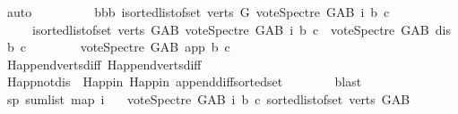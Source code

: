 \begin{isabellebody}
\ auto\ \ \isanewline
\ \ \ \ \isamarkupfalse%
\ \isamarkupfalse%
\ bbb{\isacharcolon}{\kern0pt}\ {\isachardoublequoteopen}{\isacharparenleft}{\kern0pt}{\isasymSum}i{\isasymleftarrow}sorted{\isacharunderscore}{\kern0pt}list{\isacharunderscore}{\kern0pt}of{\isacharunderscore}{\kern0pt}set\ {\isacharparenleft}{\kern0pt}verts\ G{\isacharparenright}{\kern0pt}{\isachardot}{\kern0pt}\ vote{\isacharunderscore}{\kern0pt}Spectre\ G{\isacharunderscore}{\kern0pt}AB\ i\ b\ c{\isacharparenright}{\kern0pt}\ {\isacharequal}{\kern0pt}\isanewline
\ \ \ \ \ {\isacharparenleft}{\kern0pt}{\isasymSum}i{\isasymleftarrow}sorted{\isacharunderscore}{\kern0pt}list{\isacharunderscore}{\kern0pt}of{\isacharunderscore}{\kern0pt}set\ {\isacharparenleft}{\kern0pt}verts\ G{\isacharunderscore}{\kern0pt}AB{\isacharparenright}{\kern0pt}{\isachardot}{\kern0pt}\ vote{\isacharunderscore}{\kern0pt}Spectre\ G{\isacharunderscore}{\kern0pt}AB\ i\ b\ c{\isacharparenright}{\kern0pt}\ {\isacharminus}{\kern0pt}\ vote{\isacharunderscore}{\kern0pt}Spectre\ G{\isacharunderscore}{\kern0pt}AB\ dis\ b\ c\isanewline
\ \ \ \ \ \ \ {\isacharminus}{\kern0pt}\ vote{\isacharunderscore}{\kern0pt}Spectre\ G{\isacharunderscore}{\kern0pt}AB\ app\ b\ c{\isachardoublequoteclose}\isanewline
\ \ \ \ \ \ \isamarkupfalse%
\ H{}{\isachardot}{\kern0pt}append{\isacharunderscore}{\kern0pt}verts{\isacharunderscore}{\kern0pt}diff\ H{}{\isachardot}{\kern0pt}append{\isacharunderscore}{\kern0pt}verts{\isacharunderscore}{\kern0pt}diff\ \isanewline
\ \ \ \ \ \ \isamarkupfalse%
\ H{}{\isachardot}{\kern0pt}app{\isacharunderscore}{\kern0pt}not{\isacharunderscore}{\kern0pt}dis\ \ H{}{\isachardot}{\kern0pt}app{\isacharunderscore}{\kern0pt}in{}\ H{}{\isachardot}{\kern0pt}app{\isacharunderscore}{\kern0pt}in\ append{\isacharunderscore}{\kern0pt}diff{\isacharunderscore}{\kern0pt}sorted{\isacharunderscore}{\kern0pt}set{}\isanewline
\ \ \ \ \ \ \isamarkupfalse%
\ blast\ \ \ \isanewline
\ \ \ \ \isamarkupfalse%
\ sp{}{\isacharcolon}{\kern0pt}\ {\isachardoublequoteopen}sum{\isacharunderscore}{\kern0pt}list\ {\isacharparenleft}{\kern0pt}map\ {\isacharparenleft}{\kern0pt}{\isasymlambda}i{\isachardot}{\kern0pt}\isanewline
\ \ \ {\isacharparenleft}{\kern0pt}vote{\isacharunderscore}{\kern0pt}Spectre\ G{\isacharunderscore}{\kern0pt}AB\ i\ b\ c{\isacharparenright}{\kern0pt}{\isacharparenright}{\kern0pt}\ {\isacharparenleft}{\kern0pt}sorted{\isacharunderscore}{\kern0pt}list{\isacharunderscore}{\kern0pt}of{\isacharunderscore}{\kern0pt}set\ {\isacharparenleft}{\kern0pt}verts\ G{\isacharunderscore}{\kern0pt}AB{\isacharparenright}{\kern0pt}{\isacharparenright}{\kern0pt}{\isacharparenright}{\kern0pt}\ {\isacharequal}{\kern0pt}\ \isanewline

\end{isabellebody}
